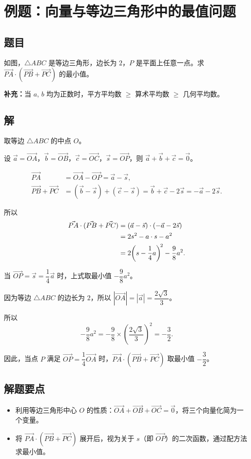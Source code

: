 \documentclass[12pt]{article}
\begin{document}
	
	\section*{例题：向量与等边三角形中的最值问题}
	
	\subsection*{题目}
	
	如图，$\triangle ABC$ 是等边三角形，边长为 $2$，$P$ 是平面上任意一点。求 $\vec{PA} \cdot (\vec{PB} + \vec{PC})$ 的最小值。
	
	\medskip
	\noindent\textbf{补充：}当 $a$, $b$ 均为正数时，平方平均数 $\geq$ 算术平均数 $\geq$ 几何平均数。
	
	\subsection*{解}
	
	取等边 $\triangle ABC$ 的中点 $O$。
	
	设 $\vec{a} = \vec{OA}$，$\vec{b} = \vec{OB}$，$\vec{c} = \vec{OC}$，$\vec{s} = \vec{OP}$，则 $\vec{a} + \vec{b} + \vec{c} = \vec{0}$。
	
	\begin{align}
		\vec{PA} &= \vec{OA} - \vec{OP} = \vec{a} - \vec{s}, \\[6pt]
		\vec{PB} + \vec{PC} &= (\vec{b} - \vec{s}) + (\vec{c} - \vec{s}) = \vec{b} + \vec{c} - 2\vec{s} = -\vec{a} - 2\vec{s}.
	\end{align}
	
	所以
	\begin{align}
		\vec{PA} \cdot (\vec{PB} + \vec{PC}) &= (\vec{a} - \vec{s}) \cdot (-\vec{a} - 2\vec{s}) \notag \\
		&= 2s^2 - a \cdot s - a^2 \notag \\
		&= 2\!\left(s - \frac{1}{4}a\right)^{\!2} - \frac{9}{8}a^2.
	\end{align}
	
	当 $\vec{OP} = \vec{s} = \dfrac{1}{4}\vec{a}$ 时，上式取最小值 $-\dfrac{9}{8}a^2$。
	
	\medskip
	
	因为等边 $\triangle ABC$ 的边长为 $2$，所以 $|\vec{OA}| = |\vec{a}| = \dfrac{2\sqrt{3}}{3}$。
	
	所以
	\[
	-\frac{9}{8}a^2 = -\frac{9}{8} \times \left(\frac{2\sqrt{3}}{3}\right)^{\!2} = -\frac{3}{2}.
	\]
	
	\medskip
	
	因此，当点 $P$ 满足 $\vec{OP} = \dfrac{1}{4}\vec{OA}$ 时，$\vec{PA} \cdot (\vec{PB} + \vec{PC})$ 取最小值 $\boxed{-\dfrac{3}{2}}$。
	
	\subsection*{解题要点}
	
	\begin{itemize}
		\item 利用等边三角形中心 $O$ 的性质：$\vec{OA} + \vec{OB} + \vec{OC} = \vec{0}$，将三个向量化简为一个变量。
		\item 将 $\vec{PA} \cdot (\vec{PB} + \vec{PC})$ 展开后，视为关于 $s$（即 $\vec{OP}$）的二次函数，通过配方法求最小值。
	\end{itemize}
	
\end{document}
